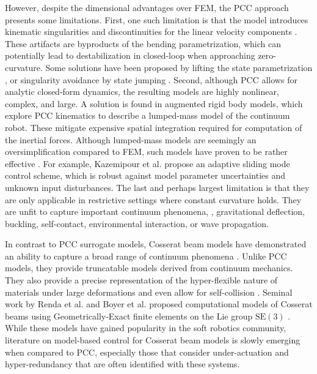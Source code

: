However, despite the dimensional advantages over FEM, the PCC approach presents some limitations. First, one such limitation is that the model introduces kinematic singularities and discontinuities for the linear velocity components \cite{Jones2006, Jones2007Apr}. These artifacts are byproducts of the bending parametrization, which can potentially lead to destabilization in closed-loop when approaching zero-curvature. Some solutions have been proposed by lifting the state parametrization \cite{DellaSantina2020Jan}, or singularity avoidance by state jumping \cite{Falkenhahn2015, Tatlicioglu2007}. Second, although PCC allows for analytic closed-form dynamics, the resulting models are highly nonlinear, complex, and large. A solution is found in augmented rigid body models, which explore PCC kinematics to describe a lumped-mass model of the continuum robot. These mitigate expensive spatial integration required for computation of the inertial forces. Although lumped-mass models are seemingly an oversimplification compared to FEM, such models have proven to be rather effective \cite{DellaSantina2020, Kazemipour2022May, Katzschmann2019, Franco2020, Franco2022}. For example, Kazemipour et al. \cite{Kazemipour2022May} propose an adaptive sliding mode control scheme, which is robust against model parameter uncertainties and unknown input disturbances. The last and perhaps largest limitation is that they are only applicable in restrictive settings where constant curvature holds. They are unfit to capture important continuum phenomena, \eg, gravitational deflection, buckling, self-contact, environmental interaction, or wave propagation.

In contrast to PCC surrogate models, Cosserat beam models have demonstrated an ability to capture a broad range of continuum phenomena \cite{Gazzola2018, Renda2017Aug, Renda2018, Boyer2010, Till2019}. Unlike PCC models, they provide truncatable models derived from continuum mechanics. They also provide a precise representation of the hyper-flexible nature of materials under large deformations and even allow for self-collision \cite{Gazzola2018}. Seminal work by Renda et al. \cite{Renda2018, Renda2020} and Boyer et al. \cite{Boyer2021} proposed computational models of Cosserat beams using Geometrically-Exact finite elements on the Lie group $\textrm{SE}(3)$ \cite{Simo1986}. While these models have gained popularity in the soft robotics community, literature on model-based control for Cosserat beam models is slowly emerging when compared to PCC, especially those that consider under-actuation and hyper-redundancy that are often identified with these systems.